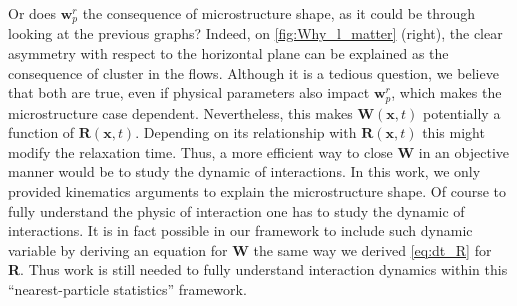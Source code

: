 Or does $\textbf{w}_p^r$ the consequence of microstructure shape, as it could be through looking at the previous graphs?
Indeed, on \ref{fig:Why_l_matter} (right), the clear asymmetry with respect to the horizontal plane can be explained as the consequence of cluster  in the flows. 
Although it is a tedious question, we believe that both are true, even if physical parameters also impact $\textbf{w}_p^r$, which makes the microstructure case dependent.  
Nevertheless, this makes $\textbf{W}(\textbf{x},t)$ potentially a function of $\textbf{R}(\textbf{x},t)$.
Depending on its relationship with $\textbf{R}(\textbf{x},t)$ this might modify the relaxation time.  
Thus, a more efficient way to close \textbf{W} in an objective manner would be to study the dynamic of interactions. 
In this work, we only provided kinematics arguments to explain the microstructure shape. 
Of course to fully understand the physic of interaction one has to study the dynamic of interactions. 
It is in fact possible in our framework to include such dynamic variable by deriving an equation for \textbf{W} the same way we derived \ref{eq:dt_R} for \textbf{R}.
Thus work is still needed to fully understand interaction dynamics within this ``nearest-particle statistics'' framework. 



